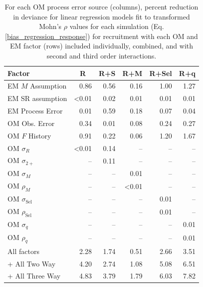 \documentclass[
  12pt,
]{article}
\begin{document}
\begin{table}
\caption{For each OM process error source (columns), percent reduction in deviance for linear regression models fit to transformed Mohn's $\rho$ values for each simulation (Eq. \ref{bias_regression_response}) for recruitment with each OM and EM factor (rows) included individually, combined, and with second and third order interactions.}\label{mohns_rho_R_PRD_table}
{\begin{center}
\begin{tabular}{lrrrrr}
\hline\hline
\multicolumn{1}{l}{Factor}&\multicolumn{1}{c}{R}&\multicolumn{1}{c}{R+S}&\multicolumn{1}{c}{R+M}&\multicolumn{1}{c}{R+Sel}&\multicolumn{1}{c}{R+q}\tabularnewline
\hline
EM $M$ Assumption&0.86&0.56&0.16&1.00&1.27\tabularnewline
EM SR assumption&\textless  0.01&0.02&0.01&0.01&0.01\tabularnewline
EM Process Error&0.01&0.59&0.18&0.07&0.04\tabularnewline
OM Obs. Error&0.34&0.01&0.08&0.24&0.27\tabularnewline
OM $F$ History&0.91&0.22&0.06&1.20&1.67\tabularnewline
OM $\sigma_R$&\textless  0.01&0.14&--&--&--\tabularnewline
OM $\sigma_{2+}$ &--&0.11&--&--&--\tabularnewline
OM $\sigma_M$&--&--&0.01&--&--\tabularnewline
OM $\rho_M$&--&--&\textless  0.01&--&--\tabularnewline
OM $\sigma_{\text{Sel}}$&--&--&--&0.01&--\tabularnewline
OM $\rho_{\text{Sel}}$&--&--&--&0.01&--\tabularnewline
OM $\sigma_q$&--&--&--&--&0.01\tabularnewline
OM $\rho_q$&--&--&--&--&0.01\tabularnewline
All factors&2.28&1.74&0.51&2.66&3.51\tabularnewline
+ All Two Way&4.20&2.74&1.08&5.08&6.51\tabularnewline
+ All Three Way&4.83&3.79&1.79&6.03&7.82\tabularnewline
\hline
\end{tabular}\end{center}
}
\end{table}
\end{document}
